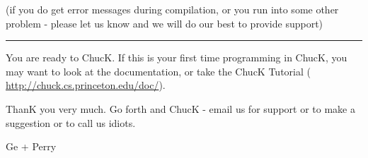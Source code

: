 
(if you do get error messages during compilation, or you run into some 
other problem - please let us know and we will do our best to provide 
support) 

\rule{1in}{.5pt}

You are ready to ChucK. If this is your first time programming in 
ChucK, you may want to look at the documentation, or take the ChucK 
Tutorial ( \href{http://chuck.cs.princeton.edu/doc}{http://chuck.cs.princeton.edu/doc/}). 

ThanK you very much. Go forth and ChucK - email us for support or to make a 
suggestion or to call us idiots.

Ge + Perry
